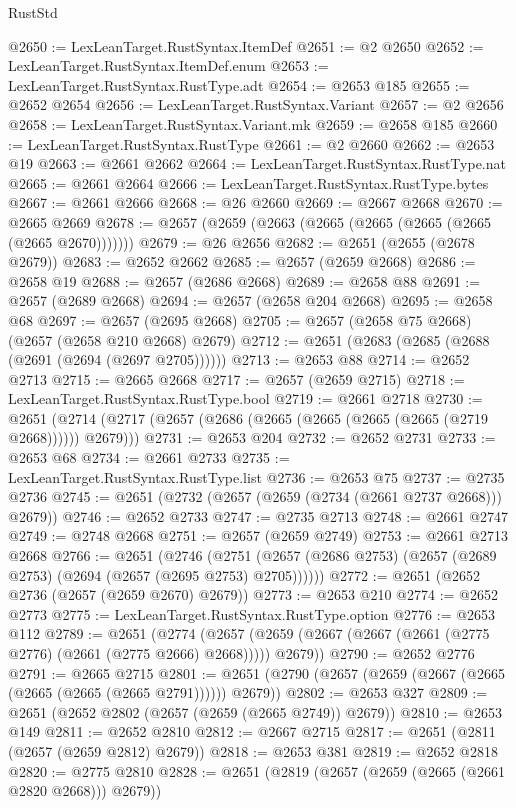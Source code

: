 \begin{lexlean}{RustStd}
\begin{coremodule}
@2650 := LexLeanTarget.RustSyntax.ItemDef
@2651 := @2 @2650
@2652 := LexLeanTarget.RustSyntax.ItemDef.enum
@2653 := LexLeanTarget.RustSyntax.RustType.adt
@2654 := @2653 @185
@2655 := @2652 @2654
@2656 := LexLeanTarget.RustSyntax.Variant
@2657 := @2 @2656
@2658 := LexLeanTarget.RustSyntax.Variant.mk
@2659 := @2658 @185
@2660 := LexLeanTarget.RustSyntax.RustType
@2661 := @2 @2660
@2662 := @2653 @19
@2663 := @2661 @2662
@2664 := LexLeanTarget.RustSyntax.RustType.nat
@2665 := @2661 @2664
@2666 := LexLeanTarget.RustSyntax.RustType.bytes
@2667 := @2661 @2666
@2668 := @26 @2660
@2669 := @2667 @2668
@2670 := @2665 @2669
@2678 := @2657 (@2659 (@2663 (@2665 (@2665 (@2665 (@2665 (@2665 @2670)))))))
@2679 := @26 @2656
@2682 := @2651 (@2655 (@2678 @2679))
@2683 := @2652 @2662
@2685 := @2657 (@2659 @2668)
@2686 := @2658 @19
@2688 := @2657 (@2686 @2668)
@2689 := @2658 @88
@2691 := @2657 (@2689 @2668)
@2694 := @2657 (@2658 @204 @2668)
@2695 := @2658 @68
@2697 := @2657 (@2695 @2668)
@2705 := @2657 (@2658 @75 @2668) (@2657 (@2658 @210 @2668) @2679)
@2712 := @2651 (@2683 (@2685 (@2688 (@2691 (@2694 (@2697 @2705))))))
@2713 := @2653 @88
@2714 := @2652 @2713
@2715 := @2665 @2668
@2717 := @2657 (@2659 @2715)
@2718 := LexLeanTarget.RustSyntax.RustType.bool
@2719 := @2661 @2718
@2730 := @2651 (@2714 (@2717 (@2657 (@2686 (@2665 (@2665 (@2665 (@2665 (@2719 @2668)))))) @2679)))
@2731 := @2653 @204
@2732 := @2652 @2731
@2733 := @2653 @68
@2734 := @2661 @2733
@2735 := LexLeanTarget.RustSyntax.RustType.list
@2736 := @2653 @75
@2737 := @2735 @2736
@2745 := @2651 (@2732 (@2657 (@2659 (@2734 (@2661 @2737 @2668))) @2679))
@2746 := @2652 @2733
@2747 := @2735 @2713
@2748 := @2661 @2747
@2749 := @2748 @2668
@2751 := @2657 (@2659 @2749)
@2753 := @2661 @2713 @2668
@2766 := @2651
    (@2746 (@2751 (@2657 (@2686 @2753) (@2657 (@2689 @2753) (@2694 (@2657 (@2695 @2753) @2705))))))
@2772 := @2651 (@2652 @2736 (@2657 (@2659 @2670) @2679))
@2773 := @2653 @210
@2774 := @2652 @2773
@2775 := LexLeanTarget.RustSyntax.RustType.option
@2776 := @2653 @112
@2789 := @2651
    (@2774 (@2657 (@2659 (@2667 (@2667 (@2661 (@2775 @2776) (@2661 (@2775 @2666) @2668))))) @2679))
@2790 := @2652 @2776
@2791 := @2665 @2715
@2801 := @2651 (@2790 (@2657 (@2659 (@2667 (@2665 (@2665 (@2665 (@2665 @2791)))))) @2679))
@2802 := @2653 @327
@2809 := @2651 (@2652 @2802 (@2657 (@2659 (@2665 @2749)) @2679))
@2810 := @2653 @149
@2811 := @2652 @2810
@2812 := @2667 @2715
@2817 := @2651 (@2811 (@2657 (@2659 @2812) @2679))
@2818 := @2653 @381
@2819 := @2652 @2818
@2820 := @2775 @2810
@2828 := @2651 (@2819 (@2657 (@2659 (@2665 (@2661 @2820 @2668))) @2679))

\end{coremodule}
\end{lexlean}
